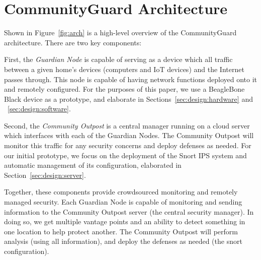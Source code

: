 \section{CommunityGuard Architecture}
\label{sec:arch}


Shown in Figure~\ref{fig:arch} is a high-level overview of the CommunityGuard architecture.
There are two key components:  

First, the \emph{Guardian Node} is capable of
serving as a device which all traffic between a given home's devices (computers and IoT devices)
and the Internet passes through.  This node is capable of having network functions
deployed onto it and remotely configured.  For the purposes of this paper,
we use a BeagleBone Black device as a prototype, and elaborate in Sections~\ref{sec:design:hardware} and ~\ref{sec:design:software}.

Second, the \emph{Community Outpost} is a central manager running on a cloud server which
interfaces with each of the Guardian Nodes. The Community Outpost will monitor this 
traffic for any security concerns and deploy defenses as needed.   
For our initial prototype, we focus on the deployment of the Snort IPS system 
and automatic management of its configuration, elaborated in Section~\ref{sec:design:server}.

Together, these components provide crowdsourced monitoring and remotely managed security.  
Each Guardian Node is capable of monitoring and sending information to the Community Outpost server
(the central security manager).  In doing so, we get multiple vantage points and an ability 
to detect something in one location to help protect another.  
The Community Outpost will perform analysis (using all information), and deploy the 
defenses as needed (the snort configuration).  
%
%
%


